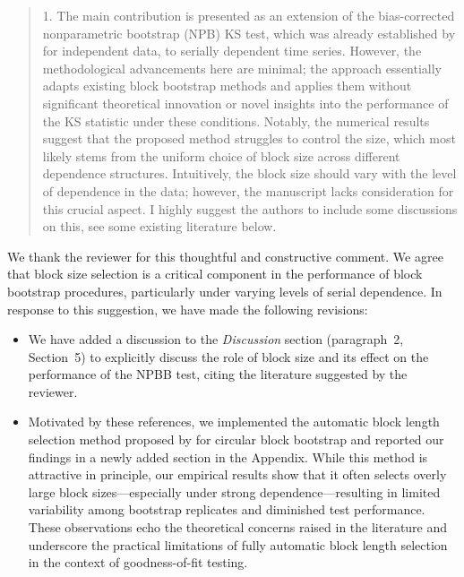 \documentclass[12pt]{article}
\newenvironment{comment}%
{\begin{quotation}\noindent\small\it\color{darkblue}\ignorespaces%
}{\end{quotation}}
\begin{document}
\begin{comment}
1. The main contribution is presented as an extension of the bias-corrected 
nonparametric bootstrap (NPB) KS test, which was already established by 
\citet{babu2004goodness}
for independent data, to serially dependent time series. However, the 
methodological advancements
here are minimal; the approach essentially adapts existing block bootstrap 
methods and applies them without significant theoretical innovation or novel 
insights into the performance
of the KS statistic under these conditions. Notably, the numerical results 
suggest that the
proposed method struggles to control the size, which most likely stems from the 
uniform
choice of block size across different dependence structures. Intuitively, the 
block size should
vary with the level of dependence in the data; however, the manuscript lacks 
consideration
for this crucial aspect. I highly suggest the authors to include some 
discussions on this, see
some existing literature below.

\citet{hall1995blocking}

\citet{lahiri1999theoretical}

\citet{buhlmann2002bootstraps}

\citet{politis2004automatic}

\citet{lahiri2013resampling}

\end{comment}

We thank the reviewer for this thoughtful and constructive comment. 
We agree that block size selection is a critical component in the 
performance of block bootstrap procedures, particularly under varying 
levels of serial dependence. In response to this suggestion, we have 
made the following revisions:

\begin{itemize}
\item We have added a discussion to the \emph{Discussion} section
  (paragraph~2, Section~5) to explicitly discuss
  the role of block size and its effect on the 
  performance of the NPBB test, citing the literature suggested by the
  reviewer.

\item Motivated by these references, we implemented the automatic block 
length selection method proposed by \citet{politis2004automatic} for 
circular block bootstrap and reported our findings in a newly added
section in the Appendix. 
While this method is attractive in principle, our empirical results show 
that it often selects overly large block sizes---especially under strong 
dependence---resulting in limited variability among bootstrap replicates 
and diminished test performance. These observations echo the theoretical 
concerns raised in the literature and underscore the practical limitations 
of fully automatic block length selection in the context of 
goodness-of-fit testing.
\end{itemize}
\end{document}
